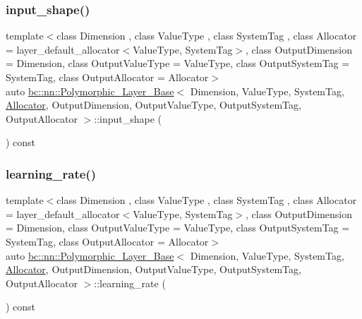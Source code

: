 \subsubsection{\texorpdfstring{input\+\_\+shape()}{input\_shape()}\hspace{0.1cm}{\footnotesize\ttfamily [2/2]}}
{\footnotesize\ttfamily template$<$class Dimension , class Value\+Type , class System\+Tag , class Allocator  = layer\+\_\+default\+\_\+allocator$<$\+Value\+Type, System\+Tag$>$, class Output\+Dimension  = Dimension, class Output\+Value\+Type  = Value\+Type, class Output\+System\+Tag  = System\+Tag, class Output\+Allocator  = Allocator$>$ \\
auto \hyperlink{structbc_1_1nn_1_1Polymorphic__Layer__Base}{bc\+::nn\+::\+Polymorphic\+\_\+\+Layer\+\_\+\+Base}$<$ Dimension, Value\+Type, System\+Tag, \hyperlink{classbc_1_1allocators_1_1Allocator}{Allocator}, Output\+Dimension, Output\+Value\+Type, Output\+System\+Tag, Output\+Allocator $>$\+::input\+\_\+shape (\begin{DoxyParamCaption}{ }\end{DoxyParamCaption}) const\hspace{0.3cm}{\ttfamily [inline]}}

\mbox{\label{structbc_1_1nn_1_1Polymorphic__Layer__Base_a1b07bace4eb7d7255881d13358c29d26}} 
\subsubsection{\texorpdfstring{learning\+\_\+rate()}{learning\_rate()}\hspace{0.1cm}{\footnotesize\ttfamily [1/2]}}
{\footnotesize\ttfamily template$<$class Dimension , class Value\+Type , class System\+Tag , class Allocator  = layer\+\_\+default\+\_\+allocator$<$\+Value\+Type, System\+Tag$>$, class Output\+Dimension  = Dimension, class Output\+Value\+Type  = Value\+Type, class Output\+System\+Tag  = System\+Tag, class Output\+Allocator  = Allocator$>$ \\
auto \hyperlink{structbc_1_1nn_1_1Polymorphic__Layer__Base}{bc\+::nn\+::\+Polymorphic\+\_\+\+Layer\+\_\+\+Base}$<$ Dimension, Value\+Type, System\+Tag, \hyperlink{classbc_1_1allocators_1_1Allocator}{Allocator}, Output\+Dimension, Output\+Value\+Type, Output\+System\+Tag, Output\+Allocator $>$\+::learning\+\_\+rate (\begin{DoxyParamCaption}{ }\end{DoxyParamCaption}) const\hspace{0.3cm}{\ttfamily [inline]}}

